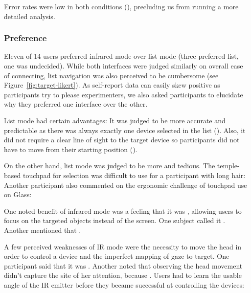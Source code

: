 Error rates were low in both conditions (), precluding us from running a more detailed analysis.

\subsubsection{Preference}
Eleven of 14 users preferred infrared mode over list mode (three preferred list, one was undecided). While both interfaces were judged similarly on overall ease of connecting, list navigation was also perceived to be cumbersome (see Figure~\ref{fig:target-likert}). As self-report data can easily skew positive as participants try to please experimenters, we also asked participants to elucidate why they preferred one interface over the other.

List mode had certain advantages: It was judged to be more accurate and predictable as there was always exactly one device selected in the list (). Also, it did not require a clear line of sight to the target device so participants did not have to move from their starting position (). 

On the other hand, list mode was judged to be more  and tedious. The temple-based touchpad for selection was difficult to use for a participant with long hair:  Another participant also commented on the ergonomic challenge of touchpad use on Glass: 

One noted benefit of infrared mode was a feeling that it was , allowing users to focus on the targeted objects instead of the screen. One subject called it . Another mentioned that . 

A few perceived weaknesses of IR mode were the necessity to move the head in order to control a device and the imperfect mapping of gaze to target. One participant said that it was . Another noted that observing the head movement didn't capture the site of her attention, because . Users had to learn the usable angle of the IR emitter before they became successful at controlling the devices: 



